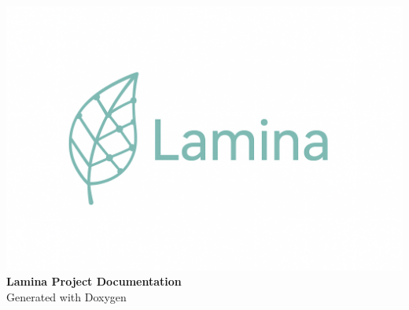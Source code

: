 \begin{titlepage}
\begin{center}
\vspace*{2cm}
\includegraphics[width=\textwidth]{./LogoLaminaLatex.png} \\[1cm]
{\Huge \textbf{Lamina Project Documentation}} \\[1cm]
{\large Generated with Doxygen} \\[2cm]
\end{center}
\end{titlepage}

